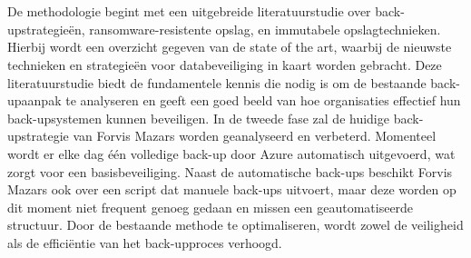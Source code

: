 
\chapter{}%
\label{ch:methodologie}


De methodologie begint met een uitgebreide literatuurstudie over back-upstrategieën, ransomware-resistente opslag, en immutabele opslagtechnieken. Hierbij wordt een overzicht gegeven van de state of the art, waarbij de nieuwste technieken en strategieën voor databeveiliging in kaart worden gebracht. Deze literatuurstudie biedt de fundamentele kennis die nodig is om de bestaande back-upaanpak te analyseren en geeft een goed beeld van hoe organisaties effectief hun back-upsystemen kunnen beveiligen. In de tweede fase zal de huidige back-upstrategie van Forvis Mazars worden geanalyseerd en verbeterd. Momenteel wordt er elke dag één volledige back-up door Azure automatisch uitgevoerd, wat zorgt voor een basisbeveiliging. Naast de automatische back-ups beschikt Forvis Mazars ook over een script dat manuele back-ups uitvoert, maar deze worden op dit moment niet frequent genoeg gedaan en missen een geautomatiseerde structuur. Door de bestaande methode te optimaliseren, wordt zowel de veiligheid als de efficiëntie van het back-upproces verhoogd.
